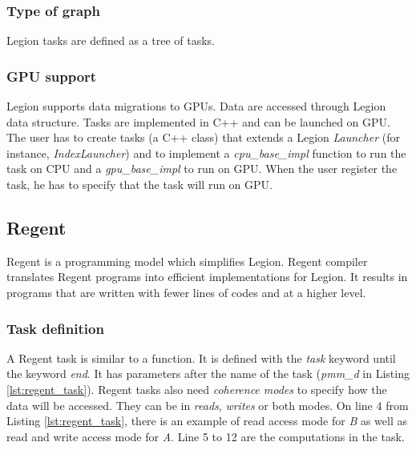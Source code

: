 \subsubsection{Type of graph}
Legion tasks are defined as a tree of tasks.

\subsubsection{GPU support}
Legion supports data migrations to GPUs.
Data are accessed through Legion data structure.
Tasks are implemented in C++ and can be launched on GPU.
The user has to create tasks (a C++ class) that extends a Legion \textit{Launcher} (for instance, \textit{IndexLauncher}) and to implement a \textit{cpu\_base\_impl} function to run the task on CPU and a \textit{gpu\_base\_impl} to run on GPU.
When the user register the task, he has to specify that the task will run on GPU.

\subsection{Regent}
Regent \cite{SLTBA2015} is a programming model which simplifies Legion.
Regent compiler translates Regent programs into efficient implementations for Legion.
It results in programs that are written with fewer lines of codes and at a higher level.

\subsubsection{Task definition}
A Regent task is similar to a function.
It is defined with the \textit{task} keyword until the keyword \textit{end}.
It has parameters after the name of the task (\textit{pmm\_d} in Listing \ref{lst:regent_task}).
Regent tasks also need \textit{coherence modes} to specify how the data will be accessed.
They can be in \textit{reads}, \textit{writes} or both modes.
On line 4 from Listing \ref{lst:regent_task}, there is an example of read access mode for \textit{B} as well as read and write access mode for \textit{A}.
Line 5 to 12 are the computations in the task.


\begin{figure}

\end{figure}

\begin{figure}

\end{figure}

